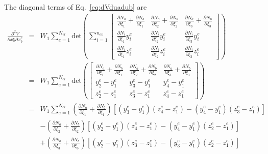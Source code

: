The diagonal terms of Eq.\ \eqref{eq:dVduadub} are
%
\begin{eqnarray}
\frac{\partial^2 V}{\partial x_a^e \partial x_b^e} &=& W_1\sum_{e=1}^{N_{el}} \text{det}\left(\sum_{i=1}^{n_{en}}
%
\begin{bmatrix}
\frac{\partial N_a}{\partial \xi_1}+\frac{\partial N_b}{\partial \xi_1}  & \frac{\partial N_a}{\partial \xi_2}+\frac{\partial N_b}{\partial \xi_2} & \frac{\partial N_a}{\partial \xi_3}+\frac{\partial N_b}{\partial \xi_3} \\
%
\frac{\partial N_i}{\partial \xi_1}y_i^e   & \frac{\partial N_i}{\partial \xi_2}y_i^e & \frac{\partial N_i}{\partial \xi_3}y_i^e \\
%
\frac{\partial N_i}{\partial \xi_1}z_i^e  & \frac{\partial N_i}{\partial \xi_2}z_i^e & \frac{\partial N_i}{\partial \xi_3}z_i^e 
\end{bmatrix}\right) \nonumber\\
&=&W_1 \sum_{e=1}^{N_{el}} \text{det}\left(
%
\begin{bmatrix}
\frac{\partial N_a}{\partial \xi_1}+\frac{\partial N_b}{\partial \xi_1}  & \frac{\partial N_a}{\partial \xi_2}+\frac{\partial N_b}{\partial \xi_2} & \frac{\partial N_a}{\partial \xi_3}+\frac{\partial N_b}{\partial \xi_3} \\
%
y_2^e - y_1^e & y_3^e - y_1^e & y_4^e - y_1^e \\
%
z_2^e - z_1^e & z_3^e - z_1^e & z_4^e - z_1^e 
\end{bmatrix}\right) \nonumber\\
&=& W_1\sum_{e=1}^{N_{el}}\left(\frac{\partial N_a}{\partial \xi_1}+\frac{\partial N_b}{\partial \xi_1}\right)[(y_3^e - y_1^e)(z_4^e - z_1^e)-(y_4^e - y_1^e)(z_3^e - z_1^e)] \nonumber\\
%
&&-\left(\frac{\partial N_a}{\partial \xi_2}+\frac{\partial N_b}{\partial \xi_2}\right)\left[(y_2^e - y_1^e)(z_4^e - z_1^e)-(y_4^e - y_1^e)(z_2^e - z_1^e)\right] \nonumber\\
%
&&+\left(\frac{\partial N_a}{\partial \xi_3}+\frac{\partial N_b}{\partial \xi_3}\right)\left[(y_2^e - y_1^e)(z_3^e - z_1^e)-(y_3^e - y_1^e)(z_2^e - z_1^e)\right]
\end{eqnarray}
